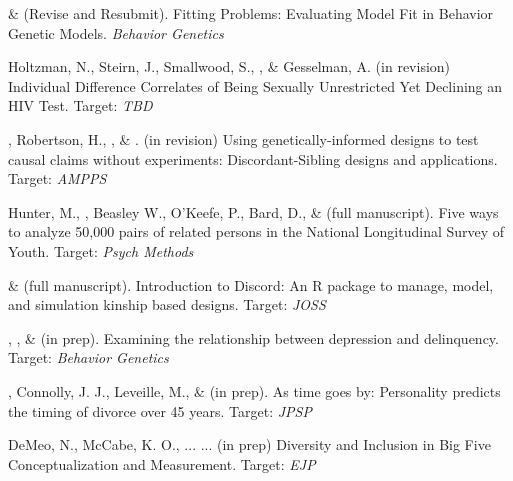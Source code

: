 


\item \meb \& \joe (Revise and Resubmit). Fitting Problems: Evaluating Model Fit in Behavior Genetic Models. \textit{Behavior Genetics}

\item Holtzman, N., Steirn, J., Smallwood, S., \meb, \& Gesselman, A. (in revision) Individual Difference Correlates of Being Sexually Unrestricted Yet Declining an HIV Test.  Target: \textit{TBD} %

\item \meb, Robertson, H.\noteA, \jt, \& \joe. (in revision) Using genetically-informed designs to test causal claims without experiments: Discordant-Sibling designs and applications. \href{https://osf.io/zpdwt/}{\small\color{blue}{osf.io/zpdwt/}} Target: \textit{AMPPS} %


\item Hunter, M., \meb, Beasley W., O'Keefe, P.,  Bard, D., \& \Joe (full manuscript). Five ways to analyze 50,000 pairs of related persons in the National Longitudinal Survey of Youth.  Target: \textit{Psych Methods}

\item \jt \& \meb (full manuscript). Introduction to Discord: An R package to manage, model, and simulation kinship based designs. Target: \textit{JOSS}


\item \emsims, \jt, \& \meb (in prep). Examining the relationship between depression and delinquency. Target: \textit{Behavior Genetics}

\item \meb, Connolly, J. J., Leveille, M., \& \jjj (in prep). As time goes by: Personality predicts the timing of divorce over 45 years. Target: \textit{JPSP}
%


\item DeMeo, N., McCabe, K. O., ... \meb ... (in prep) Diversity and Inclusion in Big Five Conceptualization and Measurement.  Target: \textit{EJP}


